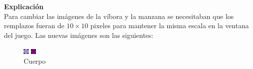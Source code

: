 \documentclass[11pt, twocolumn]{article}
\begin{document}
  \textbf{Explicación} \\
  Para cambiar las imágenes de la víbora y la manzana se necesitaban que los remplazos fueran de $10\times 10$ pixeles para mantener la misma escala en la ventana del juego. Las nuevas imágenes son las siguientes:

  \begin{figure}[ht]
    \centering
    \begin{minipage}[l]{0.3\columnwidth}
      \includegraphics[width=\columnwidth, left]{dot.png}
      \caption*{Cuerpo}
    \end{minipage}
    \begin{minipage}[c]{0.3\columnwidth}
      \includegraphics[width=\columnwidth, center]{head.png}

\end{minipage}
\end{figure}
\end{document}
